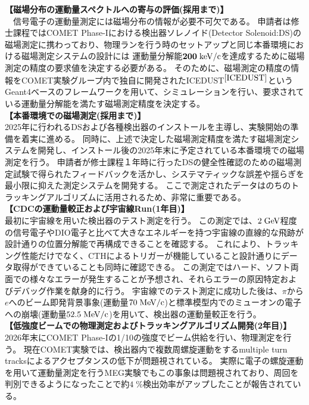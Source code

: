\documentclass[11pt,a4j,dvipdfmx]{jarticle} 					%
\newcommand{\研究課題名}{ミューオン電子転換探索の感度向上に向けた解析手法の開発}
\newcommand{\研究機関名}{大阪大学}
\newcommand{\研究代表者氏名}{高見 翔太   }
\begin{document}
\noindent \textbf{【磁場分布の運動量スペクトルへの寄与の評価(採用まで)】}\\
　信号電子の運動量測定には磁場分布の情報が必要不可欠である。
申請者は修士課程ではCOMET Phase-Iにおける検出器ソレノイド(Detector Solenoid:DS)の磁場測定に携わっており、物理ランを行う時のセットアップと同じ本番環境における磁場測定システムの設計には
運動量分解能$\mathbf{200\;\rm{keV/c}}$を達成するために磁場測定の精度の要求値を決定する必要がある。
そのために、磁場測定の精度の情報をCOMET実験グループ内で独自に開発されたICEDUST$^{\cite{ICEDUST}}$というGeant4ベースのフレームワークを用いて、シミュレーションを行い、要求されている運動量分解能を満たす磁場測定精度を決定する。
\\
\textbf{【本番環境での磁場測定(採用まで)】}\\
2025年に行われるDSおよび各種検出器のインストールを主導し、実験開始の準備を着実に進める。
同時に、上述で決定した磁場測定精度を満たす磁場測定システムを開発し、インストール後の2025年末に予定されている本番環境での磁場測定を行う。
申請者が修士課程１年時に行ったDSの健全性確認のための磁場測定試験で得られたフィードバックを活かし、システマティックな誤差や揺らぎを最小限に抑えた測定システムを開発する。
ここで測定されたデータはのちのトラッキングアルゴリズムに活用されるため、非常に重要である。
\\
\textbf{【CDCの運動量較正および宇宙線Run(1年目)】}\\
最初に宇宙線を用いた検出器のテスト測定を行う。
この測定では、$2\;\rm{GeV}$程度の信号電子やDIO電子と比べて大きなエネルギーを持つ宇宙線の直線的な飛跡が設計通りの位置分解能で再構成できることを確認する。
これにより、トラッキング性能だけでなく、CTHによるトリガーが機能していること設計通りにデータ取得ができていることも同時に確認できる。
この測定ではハード、ソフト両面での様々なエラーが発生することが予想され、それらエラーの原因特定およびデバッグ作業を献身的に行う。
宇宙線でのテスト測定に成功した後は、$\pi$から$e$へのビーム即発背景事象(運動量$70\;\rm{MeV/c}$)と標準模型内でのミューオンの電子への崩壊(運動量$52.5\;\rm{MeV/c}$)を用いて、検出器の運動量較正を行う。
\\
\textbf{【低強度ビームでの物理測定およびトラッキングアルゴリズム開発(2年目)】}\\
2026年末にCOMET Phase-Iの1/10の強度でビーム供給を行い、物理測定を行う。
現在COMET実験では、検出器内で複数周螺旋運動をするmultiple turn tracksによるアクセプタンスの低下が問題視されている。
実際に電子の螺旋運動を用いて運動量測定を行うMEG実験でもこの事象は問題視されており、周回を判別できるようになったことで約$4\;{\%}$検出効率がアップしたことが報告されている。
\end{document}
